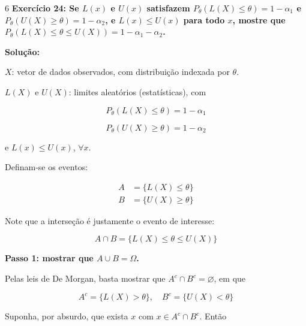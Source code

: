\documentclass[8pt, a4paper, landscape]{extarticle}
\begin{document}
\begin{multicols}{6}
\textbf{Exercício 24: Se $L(x)$ e $U(x)$ satisfazem $P_\theta(L(X) \leq \theta) = 1 - \alpha_1$ e $P_\theta(U(X) \geq \theta) = 1 - \alpha_2$, e $L(x) \leq U(x)$ para todo $x$, mostre que $P_\theta(L(X) \leq \theta \leq U(X)) = 1 - \alpha_1 - \alpha_2$.}

\vspace{0.3cm}

\textbf{Solução:}

$X$: vetor de dados observados, com distribuição indexada por $\theta$.

$L(X)$ e $U(X)$: limites aleatórios (estatísticas), com

\begin{equation*}
P_\theta(L(X) \leq \theta) = 1 - \alpha_1
\end{equation*}

\begin{equation*}
P_\theta(U(X) \geq \theta) = 1 - \alpha_2
\end{equation*}

e $L(x) \leq U(x)$, $\forall x$.

\vspace{0.2cm}

Definam-se os eventos:

\begin{equation*}
\begin{split}
A &= \{L(X) \leq \theta\} \\
B &= \{U(X) \geq \theta\}
\end{split}
\end{equation*}

Note que a interseção é justamente o evento de interesse:

\begin{equation*}
A \cap B = \{L(X) \leq \theta \leq U(X)\}
\end{equation*}

\vspace{0.2cm}

\textbf{Passo 1: mostrar que $A \cup B = \Omega$.}

Pelas leis de De Morgan, basta mostrar que $A^c \cap B^c = \varnothing$, em que

\begin{equation*}
A^c = \{L(X) > \theta\}, \quad B^c = \{U(X) < \theta\}
\end{equation*}

Suponha, por absurdo, que exista $x$ com $x \in A^c \cap B^c$. Então


\end{multicols}
\end{document}
